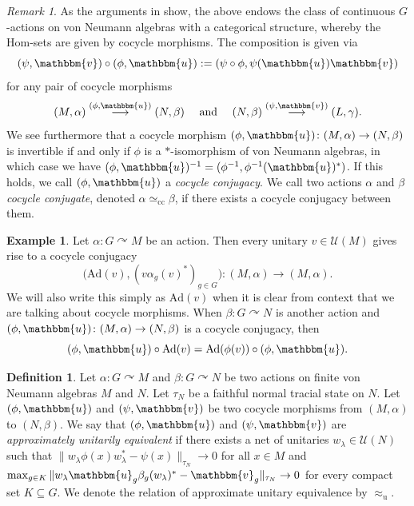 \documentclass[11pt,a4paper]{article}
\theoremstyle{definition}
\newtheorem{example}[theorem]{Example}
\newtheorem{definition}[theorem]{Definition}
\theoremstyle{remark}
\newtheorem{remark}[theorem]{Remark}
\numberwithin{equation}{section}
\numberwithin{theorem}{section}
\newcommand{\acts}{\curvearrowright}
\begin{document}
\begin{remark} \label{rem:cocycle-category}
As the arguments in \cite[Subsection 1.3]{Szabo21cc} show, the above endows the class of continuous $G$-actions on von Neumann algebras with a categorical structure, whereby the Hom-sets are given by cocycle morphisms.
The composition is given via
\[
(\psi,\mathbbm{v}) \circ (\phi,\mathbbm{u}) := (\psi \circ \phi, \psi(\mathbbm{u}) \mathbbm{v})
\]
for any pair of cocycle morphisms
\[
(M, \alpha) \overset{(\phi,\mathbbm{u})}{\longrightarrow} (N, \beta) \quad \text{ and } \quad (N, \beta)  \overset{(\psi,\mathbbm{v})}{\longrightarrow} (L, \gamma).
\]
We see furthermore that a cocycle morphism $(\phi, \mathbbm{u})\colon(M, \alpha) \rightarrow (N, \beta)$ is invertible if and only if $\phi$ is a $*$-isomorphism of von Neumann algebras, in which case we have $(\phi, \mathbbm{u})^{-1} = (\phi^{-1}, \phi^{-1}(\mathbbm{u})^*)$.
If this holds, we call $(\phi, \mathbbm{u})$ a \emph{cocycle conjugacy}.
We call two actions $\alpha$ and $\beta$ \emph{cocycle conjugate}, denoted $\alpha \simeq_{\mathrm{cc}} \beta$, if there exists a cocycle conjugacy between them.
\end{remark}

\begin{example} \label{ex:inner-cc}
Let $\alpha\colon G \acts M$ be an action.
Then every unitary $v \in \mathcal{U}(M)$ gives rise to a cocycle conjugacy 
\[
\big( \mathrm{Ad}(v), (v \alpha_g(v)^*)_{g \in G} \big) \colon (M, \alpha) \rightarrow (M, \alpha).\]
We will also write this simply as $\mathrm{Ad}(v)$ when it is clear from context that we are talking about cocycle morphisms. 
%
When $\beta\colon G \acts N$ is another action and ${(\phi, \mathbbm{u})\colon (M, \alpha) \rightarrow (N, \beta)}$ is a cocycle conjugacy, then
\[ (\phi,\mathbbm{u}) \circ \mathrm{Ad}(v) = \mathrm{Ad}(\phi(v)) \circ (\phi, \mathbbm{u}).\] 
\end{example}


\begin{definition} \label{def:approx-ue}
Let $\alpha:G \acts M$ and $\beta\colon G \acts N$ be two actions on finite von Neumann algebras $M$ and $N$.
Let $\tau_N$ be a faithful normal tracial state on $N$.
Let $(\phi,\mathbbm{u})$ and $(\psi,\mathbbm{v})$ be two cocycle morphisms from $(M,\alpha)$ to $(N,\beta)$. We say that $(\phi,\mathbbm{u})$ and $(\psi,\mathbbm{v})$ are \emph{approximately unitarily equivalent} if there exists a net of unitaries $w_\lambda \in \mathcal{U}(N)$ such that $\|w_\lambda\phi(x)w_\lambda^*-\psi(x)\|_{\tau_N} \to 0$ for all $x\in M$ and $\max_{g\in K} \| w_\lambda \mathbbm{u}_g \beta_g(w_\lambda)^* - \mathbbm{v}_g\|_{\tau_N} \rightarrow 0$ for every compact set $K\subseteq G$.
We denote the relation of approximate unitary equivalence by $\approx_{\mathrm{u}}$.
\end{definition}
\end{document}

